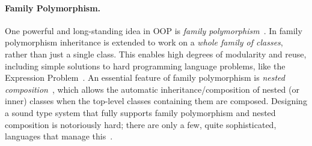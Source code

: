 \paragraph{Family Polymorphism.}
One powerful and long-standing idea in OOP is \emph{family
  polymorphism}~\citep{Ernst_2001}. In family polymorphism inheritance is
extended to work on a \emph{whole family of classes}, rather than just a single
class. This enables high degrees of modularity and
reuse, including simple solutions to hard programming language problems, like
the Expression Problem~\citep{wadler1998expression}. An essential feature of
family polymorphism is \emph{nested composition}~\citep{Corradi_2012,
  ErnstVirtual, Nystrom_2004}, which allows the automatic
inheritance/composition of nested (or inner) classes when the top-level classes
containing them are composed. Designing a sound type system that fully supports family
polymorphism and nested composition is notoriously hard; there are only
a few, quite sophisticated, languages that manage this~\citep{ErnstVirtual, Nystrom_2004, pubsdoc:tribe-virtual-calculus, SAITO_2007}.

